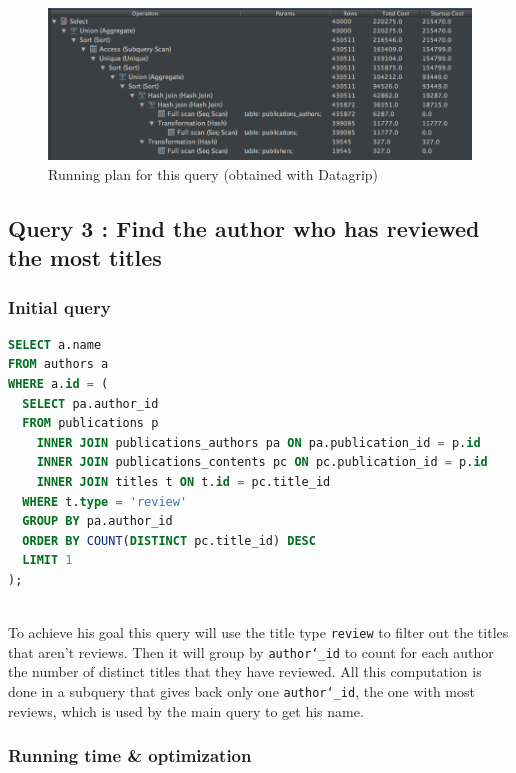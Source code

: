 \documentclass[doubleside, titlepage]{article}
\begin{document}
\begin{figure}[!htb]
	\centering
    \includegraphics[scale = 0.5]{./query_analysis/query16}
    \caption{Running plan for this query (obtained with Datagrip)}
\end{figure}

\newpage

\subsection{Query 3 : Find the author who has reviewed the most titles}

\subsubsection{Initial query}
		\begin{lstlisting}[language=SQL,showspaces=false,basicstyle=\ttfamily,numberstyle=\tiny,commentstyle=\color{gray}]
SELECT a.name
FROM authors a
WHERE a.id = (
  SELECT pa.author_id
  FROM publications p
    INNER JOIN publications_authors pa ON pa.publication_id = p.id
    INNER JOIN publications_contents pc ON pc.publication_id = p.id
    INNER JOIN titles t ON t.id = pc.title_id
  WHERE t.type = 'review'
  GROUP BY pa.author_id
  ORDER BY COUNT(DISTINCT pc.title_id) DESC
  LIMIT 1
);
		\end{lstlisting}

~\\
To achieve his goal this query will use the title type \texttt{review} to filter out the titles that aren't reviews. Then it will group by \texttt{author\char`_id} to count for each author the number of distinct titles that they have reviewed. All this computation is done in a subquery that gives back only one \texttt{author\char`_id}, the one with most reviews, which is used by the main query to get his name.
~\\

\subsubsection{Running time \& optimization}
\end{document}
